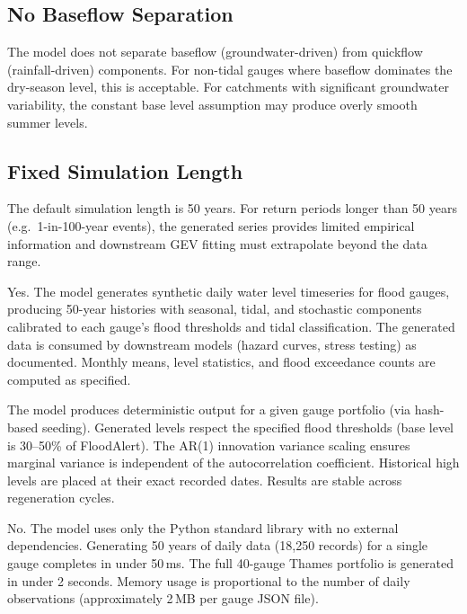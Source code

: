 \documentclass[11pt,a4paper]{article}
\begin{document}
\subsection{No Baseflow Separation}

The model does not separate baseflow (groundwater-driven) from quickflow
(rainfall-driven) components. For non-tidal gauges where baseflow dominates the
dry-season level, this is acceptable. For catchments with significant groundwater
variability, the constant base level assumption may produce overly smooth summer
levels.

\subsection{Fixed Simulation Length}

The default simulation length is 50 years. For return periods longer than 50 years
(e.g.\ 1-in-100-year events), the generated series provides limited empirical
information and downstream GEV fitting must extrapolate beyond the data range.

\mkmgovernance

Yes. The model generates synthetic daily water level timeseries for flood gauges, producing 50-year histories with seasonal, tidal, and stochastic components calibrated to each gauge's flood thresholds and tidal classification. The generated data is consumed by downstream models (hazard curves, stress testing) as documented. Monthly means, level statistics, and flood exceedance counts are computed as specified.

The model produces deterministic output for a given gauge portfolio (via hash-based seeding). Generated levels respect the specified flood thresholds (base level is 30--50\% of FloodAlert). The AR(1) innovation variance scaling ensures marginal variance is independent of the autocorrelation coefficient. Historical high levels are placed at their exact recorded dates. Results are stable across regeneration cycles.

No. The model uses only the Python standard library with no external dependencies. Generating 50 years of daily data (18,250 records) for a single gauge completes in under 50\,ms. The full 40-gauge Thames portfolio is generated in under 2 seconds. Memory usage is proportional to the number of daily observations (approximately 2\,MB per gauge JSON file).
\end{document}
